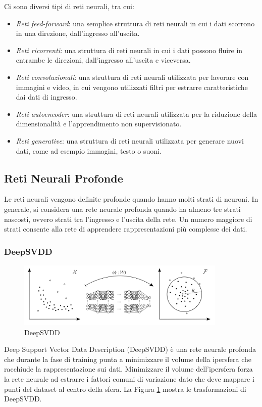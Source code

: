 Ci sono diversi tipi di reti neurali, tra cui:
\begin{itemize}
\item \textit{Reti feed-forward}: una semplice struttura di reti neurali in cui i dati scorrono in una direzione, dall'ingresso all'uscita.
\item \textit{Reti ricorrenti}: una struttura di reti neurali in cui i dati possono fluire in entrambe le direzioni, dall'ingresso all'uscita e viceversa.
\item  \textit{Reti convoluzionali}: una struttura di reti neurali utilizzata per lavorare con immagini e video, in cui vengono utilizzati filtri per estrarre caratteristiche dai dati di ingresso.
\item \textit{Reti autoencoder}: una struttura di reti neurali utilizzata per la riduzione della dimensionalità e l'apprendimento non supervisionato.
\item \textit{Reti generative}: una struttura di reti neurali utilizzata per generare nuovi dati, come ad esempio immagini, testo o suoni.
\end{itemize}


\subsection{Reti Neurali Profonde}
Le reti neurali vengono definite profonde quando hanno molti strati di neuroni. In generale, si considera una rete neurale profonda quando ha almeno tre strati nascosti, ovvero strati tra l'ingresso e l'uscita della rete. Un numero maggiore di strati consente alla rete di apprendere rappresentazioni più complesse dei dati.
\subsubsection{DeepSVDD}
\begin{figure}[t]
	\centering
	\includegraphics[width=10cm, scale=1]{images/deepsvdd}
	\caption{DeepSVDD}
	\label{deepsvdd}
\end{figure}

Deep Support Vector Data Description (DeepSVDD) \cite{ruff2018deepsvdd} è una rete neurale profonda che durante la fase di training punta a minimizzare il volume della ipersfera che racchiude la rappresentazione sui dati. Minimizzare il volume dell'ipersfera forza la rete neurale ad estrarre i fattori comuni di variazione dato che deve mappare i punti del dataset al centro della sfera.  La Figura \ref{deepsvdd} mostra le trasformazioni di DeepSVDD.

